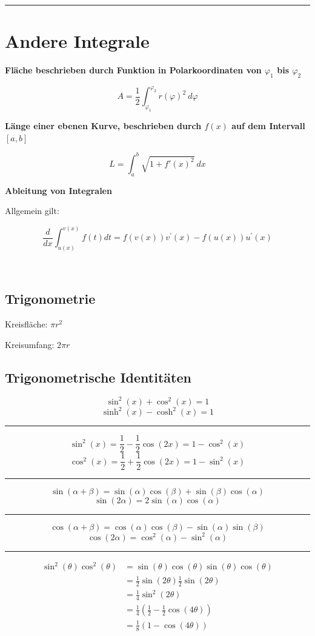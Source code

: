\documentclass[a4paper,landscape,8pt]{extarticle}
\newcommand{\sep}{\vspace{5pt}\noindent\hrule\vspace{5pt}}
\renewcommand*{\newpage}{ \ }
\begin{document}
\begin{multicols*}{4}
\sep

\section{Andere Integrale}

\textbf{Fläche beschrieben durch Funktion in Polarkoordinaten von $\varphi_1$
bis $\varphi_2$}

\[
A = \frac{1}{2} \int_{\varphi_1}^{\varphi_2} r(\varphi)^2 \ d\varphi
\]

\textbf{Länge einer ebenen Kurve, beschrieben durch $f(x)$ auf dem Intervall
$[a,b]$}

\[
L = \int_a^b \sqrt{1 + f'(x)^2} \ dx
\]

\textbf{Ableitung von Integralen}

Allgemein gilt:

\[
\frac{d}{dx}\int_{u(x)}^{v(x)}f(t)dt=f(v(x))v^\prime(x)-f(u(x))u^\prime(x)
\]


\newpage

\subsection{Trigonometrie}

Kreisfläche: $\pi r^2$

Kreisumfang: $2\pi r$


\subsection{Trigonometrische Identitäten}
\[
\sin^2(x) + \cos^2(x) = 1
\]
\[
\sinh^2(x) - \cosh^2(x) = 1
\]
\sep
\[
\sin^2(x) = \frac{1}{2} - \frac{1}{2}\cos(2x) = 1 - \cos^2(x)
\]
\[
\cos^2(x) = \frac{1}{2} + \frac{1}{2}\cos(2x) = 1 - \sin^2(x)
\]
\sep
\[
\sin(\alpha + \beta) = \sin(\alpha)\cos(\beta) + \sin(\beta)\cos(\alpha)
\]
\[
\sin(2\alpha) = 2\sin(\alpha)\cos(\alpha)
\]
\sep
\[
\cos(\alpha + \beta) = \cos(\alpha)\cos(\beta) - \sin(\alpha)\sin(\beta)
\]
\[
\cos(2\alpha) = \cos^2(\alpha) - \sin^2(\alpha)
\]
\sep

\Bsp
\begin{align*}
\sin^2(\theta)\cos^2(\theta) 
&= \sin(\theta)\cos(\theta)\sin(\theta)\cos(\theta)\\
&= \frac{1}{2}\sin(2\theta)\frac{1}{2}\sin(2\theta)\\
&= \frac{1}{4}\sin^2(2\theta)\\
&= \frac{1}{4}\left(\frac{1}{2}-\frac{1}{2}\cos(4\theta)\right)\\
&= \frac{1}{8}\left(1-\cos(4\theta)\right)\\
\end{align*}


\end{multicols*}
\end{document}
